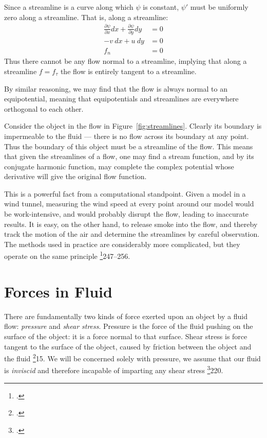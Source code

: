 \documentclass[letterpaper, twoside, 12 pt]{article}
\begin{document}
	Since a streamline is a curve along which $\psi$ is constant, $\psi'$ must be uniformly zero along a streamline.
	That is, along a streamline:
	\begin{align*}
		\frac{\partial \psi}{\partial x}dx + \frac{\partial \psi}{\partial y}dy &= 0 \\
		-v\> dx  + u\> dy &= 0 \\
		f_n &= 0
	\end{align*}
	Thus there cannot be any flow normal to a streamline, implying that along a streamline $f = f_\tau$ the flow is entirely tangent to a streamline.

	By similar reasoning, we may find that the flow is always normal to an equipotential, meaning that equipotentials and streamlines are everywhere orthogonal to each other.

	Consider the object in the flow in Figure~\ref{fig:streamlines}.
	Clearly its boundary is impermeable to the fluid --- there is no flow across its boundary at any point.
	Thus the boundary of this object must be a streamline of the flow.
	This means that given the streamlines of a flow, one may find a stream function, and by its conjugate harmonic function, may complete the complex potential whose derivative will give the original flow function.

	This is a powerful fact from a computational standpoint.
	Given a model in a wind tunnel, measuring the wind speed at every point around our model would be work-intensive, and would probably disrupt the flow, leading to inaccurate results.
	It is easy, on the other hand, to release smoke into the flow, and thereby track the motion of the air and determine the streamlines by careful observation.
	The methods used in practice are considerably more complicated, but they operate on the same principle \footcite{anderson}{247--256}.

\section{Forces in Fluid} %
\label{sec:forces_in_fluid}

	There are fundamentally two kinds of force exerted upon an object by a fluid flow: \textit{pressure} and \textit{shear stress}.
	Pressure is the force of the fluid pushing on the surface of the object: it is a force normal to that surface.
	Shear stress is force tangent to the surface of the object, caused by friction between the object and the fluid \footcite{anderson}{15}.
	We will be concerned solely with pressure, we assume that our fluid is \textit{inviscid} and therefore incapable of imparting any shear stress \footcite{motteler}{220}.
\end{document}
